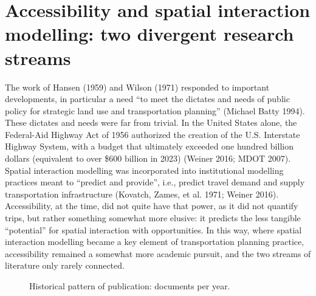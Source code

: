 \documentclass[
]{article}
\begin{document}
\section{Accessibility and spatial interaction modelling: two divergent
research
streams}\label{accessibility-and-spatial-interaction-modelling-two-divergent-research-streams}

The work of Hansen (1959) and Wilson (1971) responded to important
developments, in particular a need ``to meet the dictates and needs of
public policy for strategic land use and transportation planning''
(Michael Batty 1994). These dictates and needs were far from trivial. In
the United States alone, the Federal-Aid Highway Act of 1956 authorized
the creation of the U.S. Interstate Highway System, with a budget that
ultimately exceeded one hundred billion dollars (equivalent to over
\$600 billion in 2023) (Weiner 2016; MDOT 2007). Spatial interaction
modelling was incorporated into institutional modelling practices meant
to ``predict and provide'', i.e., predict travel demand and supply
transportation infrastructure (Kovatch, Zames, et al. 1971; Weiner
2016). Accessibility, at the time, did not quite have that power, as it
did not quantify trips, but rather something somewhat more elusive: it
predicts the less tangible ``potential'' for spatial interaction with
opportunities. In this way, where spatial interaction modelling became a
key element of transportation planning practice, accessibility remained
a somewhat more academic pursuit, and the two streams of literature only
rarely connected.

\begin{figure}[H]


\caption{\label{fig-docs-per-year}Historical pattern of publication:
documents per year.}

\end{figure}%
\end{document}
